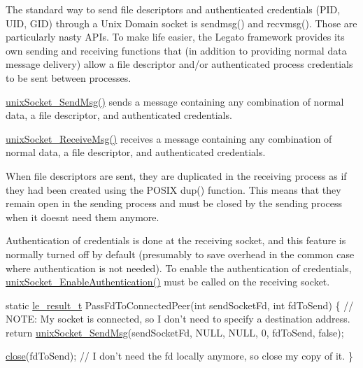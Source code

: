The standard way to send file descriptors and authenticated credentials (P\+ID, U\+ID, G\+ID) through a Unix Domain socket is sendmsg() and recvmsg(). Those are particularly nasty A\+P\+Is. To make life easier, the Legato framework provides its own sending and receiving functions that (in addition to providing normal data message delivery) allow a file descriptor and/or authenticated process credentials to be sent between processes.


\begin{DoxyItemize}
\item \hyperlink{unix_socket_8h_af81ee1e16e1ee2edbb8610fbb4e34ebe}{unix\+Socket\+\_\+\+Send\+Msg()} sends a message containing any combination of normal data, a file descriptor, and authenticated credentials.
\item \hyperlink{unix_socket_8h_ab64d779b38aa59e2a433a38f613fe191}{unix\+Socket\+\_\+\+Receive\+Msg()} receives a message containing any combination of normal data, a file descriptor, and authenticated credentials.
\end{DoxyItemize}

When file descriptors are sent, they are duplicated in the receiving process as if they had been created using the P\+O\+S\+IX dup() function. This means that they remain open in the sending process and must be closed by the sending process when it doesn\textquotesingle{}t need them anymore.

Authentication of credentials is done at the receiving socket, and this feature is normally turned off by default (presumably to save overhead in the common case where authentication is not needed). To enable the authentication of credentials, \hyperlink{unix_socket_8h_a814c92589fc434132bc1cfbfc5b37e5b}{unix\+Socket\+\_\+\+Enable\+Authentication()} must be called on the receiving socket.


\begin{DoxyCode}
\textcolor{keyword}{static} \hyperlink{le__basics_8h_a1cca095ed6ebab24b57a636382a6c86c}{le\_result\_t} PassFdToConnectedPeer(\textcolor{keywordtype}{int} sendSocketFd, \textcolor{keywordtype}{int} fdToSend)
\{
    \textcolor{comment}{// NOTE: My socket is connected, so I don't need to specify a destination address.}
    \textcolor{keywordflow}{return} \hyperlink{unix_socket_8c_af81ee1e16e1ee2edbb8610fbb4e34ebe}{unixSocket\_SendMsg}(sendSocketFd, NULL, NULL, 0, fdToSend, \textcolor{keyword}{false});

    \hyperlink{app_stop_client_8c_ac9aa243805b0ac0687f9c2e9b5bdb8ef}{close}(fdToSend); \textcolor{comment}{// I don't need the fd locally anymore, so close my copy of it.}
\}
\end{DoxyCode}


